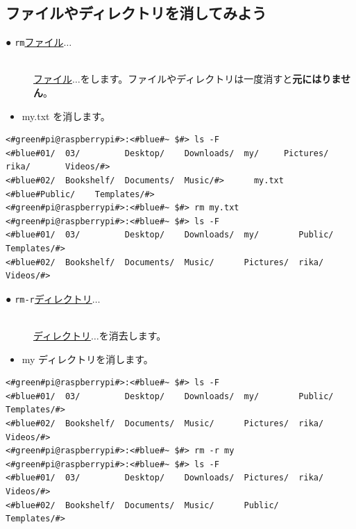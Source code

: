 \documentclass[text03.tex]{subfiles}
\begin{document}
\subsection{ファイルやディレクトリを消してみよう}
\begin{description}
\item[● \texttt{rm}\textvisiblespace \underline{ファイル}$\ldots$]\mbox{}\\
\underline{ファイル}$\ldots$をします。ファイルやディレクトリは一度消すと\textbf{元にはりません}。
\end{description}
\begin{itemize}
\item[<例>]my.txt を消します。
\end{itemize}
\begin{lstlisting}[caption=rmの例, label=rm]
<#green#pi@raspberrypi#>:<#blue#~ $#> ls -F
<#blue#01/  03/         Desktop/    Downloads/  my/     Pictures/  rika/       Videos/#>
<#blue#02/  Bookshelf/  Documents/  Music/#>      my.txt  <#blue#Public/    Templates/#>
<#green#pi@raspberrypi#>:<#blue#~ $#> rm my.txt
<#green#pi@raspberrypi#>:<#blue#~ $#> ls -F
<#blue#01/  03/         Desktop/    Downloads/  my/        Public/  Templates/#>
<#blue#02/  Bookshelf/  Documents/  Music/      Pictures/  rika/    Videos/#>
\end{lstlisting}
\begin{description}
\item[● \texttt{rm}\textvisiblespace \texttt{-r}\textvisiblespace \underline{ディレクトリ}$\ldots$]\mbox{}\\
\underline{ディレクトリ}$\ldots$を消去します。
\end{description}
\newpage
\begin{itemize}
\item[<例>]my ディレクトリを消します。
\end{itemize}
\begin{lstlisting}[caption=rm -rの例, label=rm-R]
<#green#pi@raspberrypi#>:<#blue#~ $#> ls -F
<#blue#01/  03/         Desktop/    Downloads/  my/        Public/  Templates/#>
<#blue#02/  Bookshelf/  Documents/  Music/      Pictures/  rika/    Videos/#>
<#green#pi@raspberrypi#>:<#blue#~ $#> rm -r my
<#green#pi@raspberrypi#>:<#blue#~ $#> ls -F
<#blue#01/  03/         Desktop/    Downloads/  Pictures/  rika/       Videos/#>
<#blue#02/  Bookshelf/  Documents/  Music/      Public/    Templates/#>
\end{lstlisting}
\end{document}
